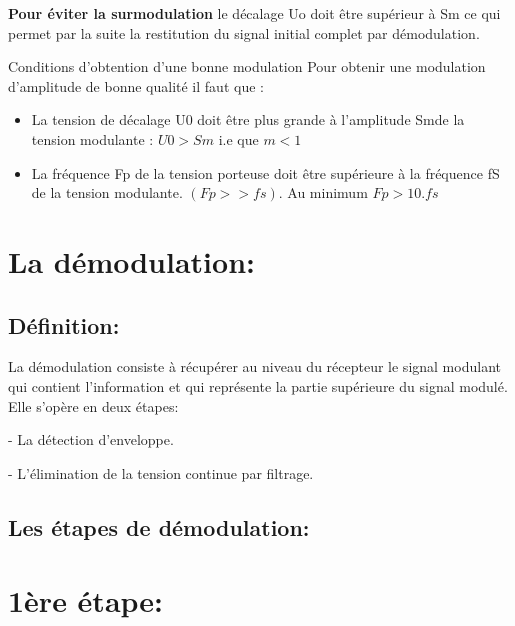 \documentclass[12pt]{article}
\begin{document}
\textbf{Pour éviter la surmodulation} le décalage Uo doit être supérieur à Sm ce qui permet par la suite la restitution du signal initial complet par
démodulation.

\begin{tcolorbox}
Conditions d’obtention d’une bonne modulation
Pour obtenir une modulation d’amplitude de bonne qualité il faut que :
\begin{itemize}
	\item  La tension de décalage U0 doit être plus grande à l’amplitude Smde la
tension modulante : $U0 > Sm$ i.e que $m < 1$
\item La fréquence Fp de la tension porteuse doit être supérieure à la
fréquence fS de la tension modulante. $(Fp >> fs)$. Au minimum
$Fp > 10.fs$

\end{itemize}
\end{tcolorbox}


\section{La démodulation:}
\subsection{Définition:}
La démodulation consiste à récupérer au niveau du récepteur le signal modulant qui contient l'information et qui représente la partie
supérieure du signal modulé. Elle s'opère en deux étapes:

- La détection d'enveloppe.

- L'élimination de la tension continue par filtrage.

\subsection{Les étapes de démodulation: }
\section*{1ère étape: }
\end{document}
